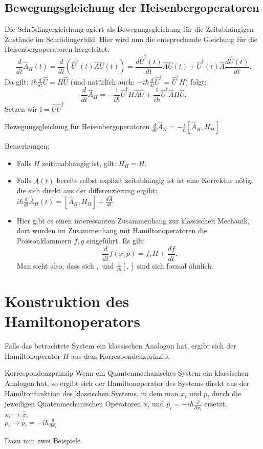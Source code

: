 \documentclass{report}
\begin{document}
\subsection{Bewegungsgleichung der Heisenbergoperatoren}
Die Schrödingergleichung agiert als Bewegungsgleichung für die Zeitabhängigen Zustände im Schrödingerbild. Hier wird nun die entsprechende Gleichung für die Heisenbergoperatoren hergeleitet. \[
	\frac{d}{dt}\hat{A}_H(t) = \frac{d}{dt}(\hat{U}^\dagger(t) \hat{A} \hat{U}(t)) = \frac{d\hat{U}^\dagger(t)}{dt}\hat{A}\hat{U}(t) + \hat{U}^\dagger(t) \hat{A} \frac{d\hat{U}(t)}{dt}
.\] Da gilt: $i\hbar \frac{d}{dt} \hat{U} = H\hat{U}$ (und natürlich auch: $-i\hbar \frac{d}{dt} \hat{U}^\dagger = \hat{U}^\dagger H$) folgt: \[
\frac{d}{dt}\hat{A}_H = -\frac{1}{i\hbar }\hat{U}^\dagger H\hat{A} \hat{U} + \frac{1}{i \hbar } \hat{U}^\dagger \hat{A} H \hat{U}
.\] Setzen wir $\mathbb{I} = \hat{U} \hat{U}^\dagger$  
\begin{redbox}{Bewegungsgleichung für Heisenbergoperatoren}
	$\frac{d}{dt}\hat{A}_H = -\frac{i}{\hbar} [\hat{A}_H, H_H]$
\end{redbox}
Bemerkungen:
\begin{itemize}
	\item Falls $H$ zeitunabhängig ist, gilt: $H_H = H$.\\
	\item Falls $\hat{A}(t)$ bereits selbst explizit zeitabhängig ist ist eine Korrektur nötig, die sich direkt aus der differenzierung ergibt: \\
		$i \hbar \frac{d}{dt} \hat{A}_H(t) = [\hat{A}_H, H_H] + \frac{d\hat{A}}{dt}$ \\
	\item Hier gibt es einen interessanten Zusammenhang zur klassischen Mechanik, dort wurden im Zusammenhang mit Hamiltonoperatoren die Poissonklammern ${f, g}$ eingeführt. Es gilt:  \[
			\frac{d}{dt} f(x,p) = {f, H} + \frac{df}{dt}
		.\] Man sieht also, dass sich ${ , }$ und  $\frac{1}{i\hbar} [ , ]$ sind sich formal ähnlich.
\end{itemize}
\section{Konstruktion des Hamiltonoperators}
Falls das betrachtete System ein klassischen Analogon hat, ergibt sich der Hamiltonoperator $H$ aus dem Korrespondenzprinzip.
\begin{greenbox}{Korrespondenzprinzip}
	Wenn ein Quantenmechanisches System ein klassischen Analogon hat, so ergibt sich der Hamiltonoperator des Systems direkt aus der Hamiltonfunktion des klassischen Systems, in dem man $x_i$ und $p_i$ durch die jeweiligen Quatenmechanischen Operatoren $\hat{x}_i$ und $\hat{p}_i = -i\hbar \frac{\partial}{\partial x_i}$ ersetzt. \\
	$x_i \to \hat{x}_i$ \\
	$p_i \to \hat{p}_i = -i\hbar \frac{d}{dx_i}$
\end{greenbox}
Dazu nun zwei Beispiele.
\end{document}
